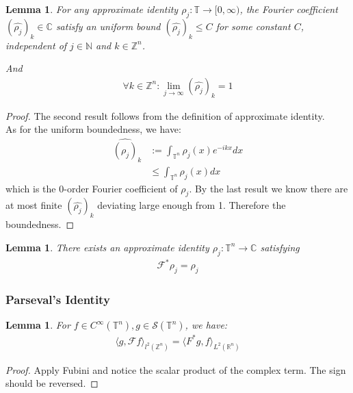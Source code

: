 \documentclass[a4paper,11pt,fleqn]{book}
\newtheorem{lemma}[theorem]{Lemma}
\theoremstyle{definition}
\theoremstyle{remark}
\begin{document}
\begin{lemma}
	For any approximate identity $\rho_j: \mathbb{T} \rightarrow [0, \infty)$, the Fourier coefficient $(\widehat{\rho_j})_k \in \mathbb{C}$ satisfy an uniform bound $(\hat{\rho_j})_k \leq C$ for some constant $C$, independent of $j \in \mathbb{N}$ and $k \in \mathbb{Z}^n$. \par
	And
	\begin{align*}
		\forall k \in \mathbb{Z}^n: \lim_{j \rightarrow \infty} (\widehat{\rho_j})_k = 1
	\end{align*} 
\end{lemma}
\begin{proof}
	The second result follows from the definition of approximate identity.\\
	As for the uniform boundedness, we have:
	\begin{align*}
		\widehat{(\rho_j)}_k &:= \int_{\mathbb{T}^n} \rho_j(x) e^{-ikx}dx\\
		&\leq \int_{\mathbb{T}^n} \rho_j(x) dx
	\end{align*}
	which is the 0-order Fourier coefficient of $\rho_j$. By the last result we know there are at most finite $(\widehat{\rho_j})_k$ deviating large enough from 1. Therefore the boundedness.
\end{proof}

\begin{lemma}
	There exists an approximate identity $\rho_j: \mathbb{T}^n \rightarrow     \mathbb{C}$ satisfying
	\begin{align*}
		\mathcal{F}^*  \rho_j = \rho_j
	\end{align*}
\end{lemma}

\subsubsection{Parseval's Identity}
\begin{lemma}
	For $f \in C^\infty(\mathbb{T}^n), g \in \mathcal{S}(\mathbb{T}^n)$, we have:
	\begin{align*}
		\langle g, \mathcal{F} f \rangle_{l^2(\mathbb{Z}^n)} = \langle F^* g, f \rangle_{L^2(\mathbb{R}^n)}
	\end{align*}
\end{lemma}
\begin{proof}
	Apply Fubini and notice the scalar product of the complex term. The sign should be reversed.
\end{proof}
\end{document}
